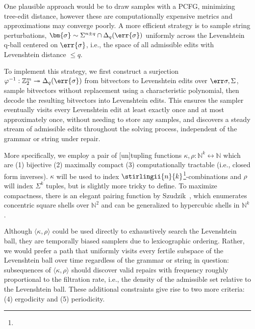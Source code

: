 \documentclass[runningheads]{llncs}
\begin{document}
One plausible approach would be to draw samples with a PCFG, minimizing tree-edit distance, however these are computationally expensive metrics and approximations may converge poorly. A more efficient strategy is to sample string perturbations, $\bm{\sigma}\sim\Sigma^{n\pm q}\cap\Delta_{q}(\err{\sigma})$ uniformly across the Levenshtein q-ball centered on $\err{\sigma}$, i.e., the space of all admissible edits with Levenshtein distance $\leq q$.

To implement this strategy, we first construct a surjection $\varphi^{-1}: \mathbb{Z}_2^m\twoheadrightarrow\Delta_{q}(\err{\sigma})$ from bitvectors to Levenshtein edits over $\err\sigma, \Sigma$, sample bitvectors without replacement using a characteristic polynomial, then decode the resulting bitvectors into Levenshtein edits. This ensures the sampler eventually visits every Levenshtein edit at least exactly once and at most approximately once, without needing to store any samples, and discovers a steady stream of admissible edits throughout the solving process, independent of the grammar or string under repair.

More specifically, we employ a pair of [un]tupling functions $\kappa, \rho: \mathbb{N}^k \leftrightarrow \mathbb{N}$ which are (1) bijective (2) maximally compact (3) computationally tractable (i.e., closed form inverses). $\kappa$ will be used to index $\stirlingii{n}{k}$\footnote[2]{}-combinations and $\rho$ will index $\Sigma^k$ tuples, but is slightly more tricky to define. To maximize compactness, there is an elegant pairing function by Szudzik~\cite{szudzik2006elegant}, which enumerates concentric square shells over $\mathbb{N}^2$ and can be generalized to hypercubic shells in $\mathbb{N}^k$.

Although $\langle\kappa, \rho\rangle$ could be used directly to exhaustively search the Levenshtein ball, they are temporally biased samplers due to lexicographic ordering. Rather, we would prefer a path that uniformly visits every fertile subspace of the Levenshtein ball over time regardless of the grammar or string in question: subsequences of $\langle\kappa, \rho\rangle$ should discover valid repairs with frequency roughly proportional to the filtration rate, i.e., the density of the admissible set relative to the Levenshtein ball. These additional constraints give rise to two more criteria: (4) ergodicity and (5) periodicity.
\end{document}
